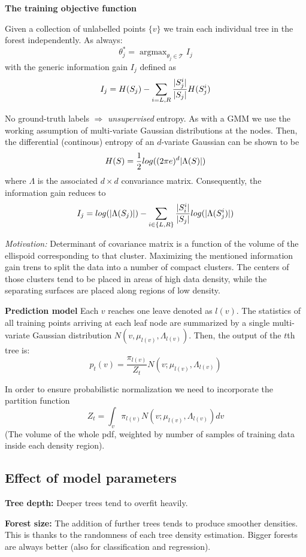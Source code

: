 \documentclass{scrartcl}
\DeclareMathOperator*{\argmax}{argmax} %
\DeclarePairedDelimiter\abs{\lvert}{\rvert}%
\begin{document}
\begin{appendices}
\textbf{The training objective function}

Given a collection of unlabelled points \(\{v\}\) we train each individual tree in the forest independently. As always:
\[\theta_j^* = \argmax_{\theta_j \in \mathcal{T}} I_j\]
with the generic information gain \(I_j\) defined as
\[I_j = H(S_j) - \sum_{i = L,R} \frac{\abs{S_j^i}}{\abs{S_j}}H(S_j^i)\]

No ground-truth labels \(\Rightarrow\) \textit{unsupervised} entropy. As with a GMM we use the working assumption of multi-variate Gaussian distributions at the nodes. Then, the differential (continous) entropy of an \(d\)-variate Gaussian can be shown to be
\[H(S) = \frac{1}{2} log((2\pi e)^d \abs{\Lambda(S)})\]
where \(\Lambda\) is the associated \(d \times d\) convariance matrix. Consequently, the information gain reduces to
\[I_j = log(\abs{\Lambda(S_j)}) - \sum_{i \in \{L, R\}} \frac{\abs{S_i^i}}{\abs{S_j}} log(\abs{\Lambda(S_j^i)})\]

\textit{Motivation:}
Determinant of covariance matrix is a function of the volume of the ellispoid corresponding to that cluster. Maximizing the mentioned information gain trens to split the data into a number of compact clusters. The centers of those clusters tend to be placed in areas of high data density, while the separating surfaces are placed along regions of low density.

\textbf{Prediction model}
Each \(v\) reaches one leave denoted as \(l(v)\). The statistics of all training points arriving at each leaf node are summarized by a single multi-variate Gaussian distribution \(N(v, \mu_{l(v)}, \Lambda_{l(v)})\). Then, the output of the \(t\)th tree is:
\[p_t(v) = \frac{\pi_{l(v)}}{Z_t} N(v; \mu_{l(v)}, \Lambda_{l(v)})\]

In order to ensure probabilistic normalization we need to incorporate the partition function \[Z_t = \int_v \pi_{l(v)} N(v; \mu_{l(v)}, \Lambda_{l(v)}) dv\]
(The volume of the whole pdf, weighted by number of samples of training data inside each density region).

\subsection{Effect of model parameters}
\textbf{Tree depth:} Deeper trees tend to overfit heavily.

\textbf{Forest size:} The addition of further trees tends to produce smoother densities. This is thanks to the randomness of each tree density estimation. Bigger forests are always better (also for classification and regression).


\end{appendices}
\end{document}
